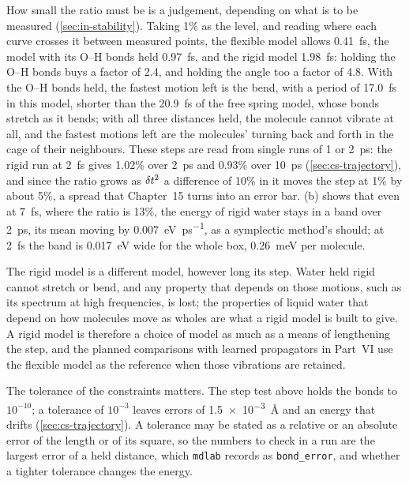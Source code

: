 How small the ratio must be is a judgement, depending on what is to be
measured (\cref{sec:in-stability}). Taking 1\% as the level, and reading
where each curve crosses it between measured points, the flexible model
allows \SI{0.41}{\femto\second}, the model with its O--H bonds held
\SI{0.97}{\femto\second}, and the rigid model \SI{1.98}{\femto\second}:
holding the O--H bonds buys a factor of 2.4, and holding the angle too a
factor of 4.8. With the O--H bonds held, the fastest motion left is the
bend, with a period of \SI{17.0}{\femto\second} in this model, shorter
than the \SI{20.9}{\femto\second} of the free spring model, whose bonds
stretch as it bends; with all three distances held, the molecule cannot
vibrate at all, and the fastest motions left are the molecules' turning
back and forth in the cage of their neighbours. These steps are read from
single runs of 1 or \SI{2}{\pico\second}: the rigid run at
\SI{2}{\femto\second} gives 1.02\% over \SI{2}{\pico\second} and 0.93\%
over \SI{10}{\pico\second} (\cref{sec:cs-trajectory}), and since the
ratio grows as $\delta t^2$ a difference of 10\% in it moves the step at 1\% by
about 5\%, a spread that Chapter~15 turns into an error bar. (b) shows that even at
\SI{7}{\femto\second}, where the ratio is 13\%, the energy of rigid water
stays in a band over \SI{2}{\pico\second}, its mean moving by
\SI{0.007}{\electronvolt\per\pico\second}, as a symplectic method's
should; at \SI{2}{\femto\second} the band is \SI{0.017}{\electronvolt}
wide for the whole box, \SI{0.26}{\milli\electronvolt} per molecule.

The rigid model is a different model, however long its step. Water held
rigid cannot stretch or bend, and any property that depends on those
motions, such as its spectrum at high frequencies, is lost; the
properties of liquid water that depend on how molecules move as wholes
are what a rigid model is built to give. A rigid model is therefore a
choice of model as much as a means of lengthening the step, and the
planned comparisons with learned propagators in Part~VI use the flexible
model as the reference when those vibrations are retained.

\begin{practice}
The tolerance of the constraints matters. The step test above holds the
bonds to $10^{-10}$; a tolerance of $10^{-3}$ leaves errors of
\SI{1.5e-3}{\angstrom} and an energy that drifts
(\cref{sec:cs-trajectory}). A tolerance may be stated as a relative or an
absolute error of the length or of its square, so the numbers to check in
a run are the largest error of a held distance, which \texttt{mdlab}
records as \texttt{bond\_error}, and whether a tighter tolerance changes
the energy.
\end{practice}


